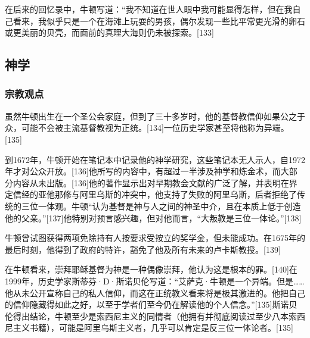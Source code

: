 在后来的回忆录中，牛顿写道：“我不知道在世人眼中我可能显得怎样，但在我自己看来，我似乎只是一个在海滩上玩耍的男孩，偶尔发现一些比平常更光滑的卵石或更美丽的贝壳，而面前的真理大海则仍未被探索。[133]
\subsection{神学}
\subsubsection{宗教观点}
虽然牛顿出生在一个圣公会家庭，但到了三十多岁时，他的基督教信仰如果公之于众，可能不会被主流基督教视为正统。[134]一位历史学家甚至将他称为异端。[135]

到1672年，牛顿开始在笔记本中记录他的神学研究，这些笔记本无人示人，自1972年才对公众开放。[136]他所写的内容中，有超过一半涉及神学和炼金术，而大部分内容从未出版。[136]他的著作显示出对早期教会文献的广泛了解，并表明在界定信经的亚他那修与阿里乌斯的冲突中，他支持了失败的阿里乌斯，后者拒绝了传统的三位一体观。牛顿“认为基督是神与人之间的神圣中介，且在本质上低于创造他的父亲。”[137]他特别对预言感兴趣，但对他而言，“大叛教是三位一体论。”[138]

牛顿曾试图获得两项免除持有人按要求受按立的奖学金，但未能成功。在1675年的最后时刻，他得到了政府的特许，豁免了他及所有未来的卢卡斯教授。[139]

在牛顿看来，崇拜耶稣基督为神是一种偶像崇拜，他认为这是根本的罪。[140]在1999年，历史学家斯蒂芬·D·斯诺贝伦写道：“艾萨克·牛顿是一个异端。但是……他从未公开宣称自己的私人信仰，而这在正统教义看来将是极其激进的。他把自己的信仰隐藏得如此之好，以至于学者们至今仍在解读他的个人信念。”[135]斯诺贝伦得出结论，牛顿至少是索西尼主义的同情者（他拥有并彻底阅读过至少八本索西尼主义书籍），可能是阿里乌斯主义者，几乎可以肯定是反三位一体论者。[135]

